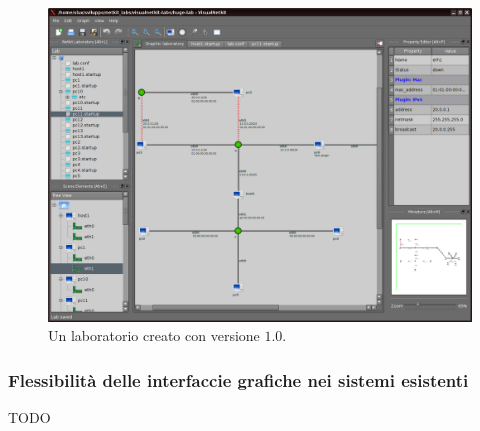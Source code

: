 \begin{figure}[!ht]
	\centering
	\includegraphics[width=12cm]{images/visualnetkit_main_1.png}
	\caption{Un laboratorio creato con \visualnetkit{} versione $1.0$.}
	\label{figura:vn_main_1}
\end{figure}

\subsubsection{Flessibilità delle interfaccie grafiche nei sistemi esistenti}
TODO

